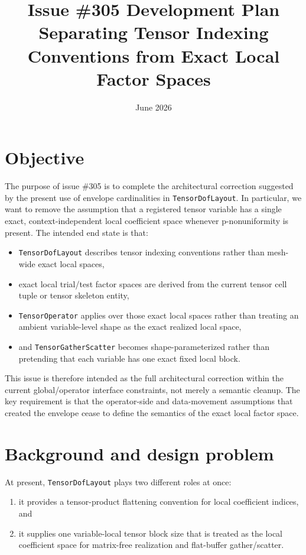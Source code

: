 \documentclass[11pt]{article}
\title{Issue \#305 Development Plan\\
Separating Tensor Indexing Conventions from Exact Local Factor Spaces}
\author{}
\date{June 2026}
\begin{document}
\maketitle

\section{Objective}

The purpose of issue \#305 is to complete the architectural correction suggested by the present use of envelope cardinalities in \texttt{TensorDofLayout}.  In particular, we want to remove the assumption that a registered tensor variable has a single exact, context-independent local coefficient space whenever p-nonuniformity is present.  The intended end state is that:

\begin{itemize}[leftmargin=2em]
\item \texttt{TensorDofLayout} describes tensor indexing conventions rather than mesh-wide exact local spaces,
\item exact local trial/test factor spaces are derived from the current tensor cell tuple or tensor skeleton entity,
\item \texttt{TensorOperator} applies over those exact local spaces rather than treating an ambient variable-level shape as the exact realized local space,
\item and \texttt{TensorGatherScatter} becomes shape-parameterized rather than pretending that each variable has one exact fixed local block.
\end{itemize}

This issue is therefore intended as the full architectural correction within the current global/operator interface constraints, not merely a semantic cleanup.  The key requirement is that the operator-side and data-movement assumptions that created the envelope cease to define the semantics of the exact local factor space.

\section{Background and design problem}

At present, \texttt{TensorDofLayout} plays two different roles at once:

\begin{enumerate}[leftmargin=2em]
\item it provides a tensor-product flattening convention for local coefficient indices, and
\item it supplies one variable-local tensor block size that is treated as the local coefficient space for matrix-free realization and flat-buffer gather/scatter.
\end{enumerate}
\end{document}

